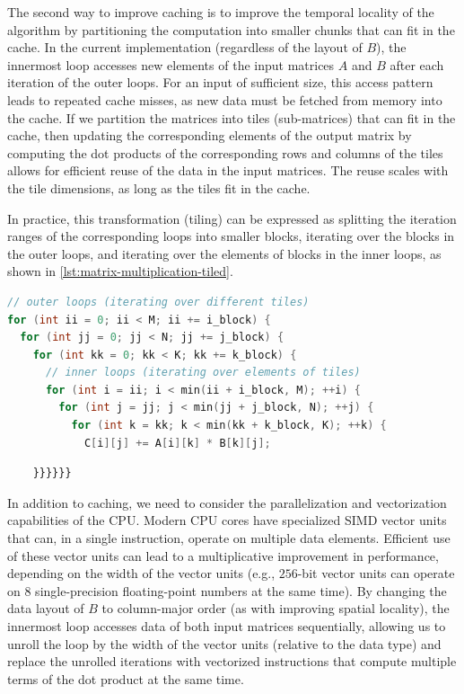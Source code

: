 The second way to improve caching is to improve the temporal locality of the algorithm by partitioning the computation into smaller chunks that can fit in the cache. In the current implementation (regardless of the layout of $B$), the innermost loop accesses new elements of the input matrices $A$ and $B$ after each iteration of the outer loops. For an input of sufficient size, this access pattern leads to repeated cache misses, as new data must be fetched from memory into the cache. If we partition the matrices into tiles (sub-matrices) that can fit in the cache, then updating the corresponding elements of the output matrix by computing the dot products of the corresponding rows and columns of the tiles allows for efficient reuse of the data in the input matrices. The reuse scales with the tile dimensions, as long as the tiles fit in the cache.

In practice, this transformation (tiling) can be expressed as splitting the iteration ranges of the corresponding loops into smaller blocks, iterating over the blocks in the outer loops, and iterating over the elements of blocks in the inner loops, as shown in \cref{lst:matrix-multiplication-tiled}.

\begin{lstlisting}[language=C++, caption={Tiled matrix multiplication}, label={lst:matrix-multiplication-tiled}]
// outer loops (iterating over different tiles)
for (int ii = 0; ii < M; ii += i_block) {
  for (int jj = 0; jj < N; jj += j_block) {
    for (int kk = 0; kk < K; kk += k_block) {
      // inner loops (iterating over elements of tiles)
      for (int i = ii; i < min(ii + i_block, M); ++i) {
        for (int j = jj; j < min(jj + j_block, N); ++j) {
          for (int k = kk; k < min(kk + k_block, K); ++k) {
            C[i][j] += A[i][k] * B[k][j];
\end{lstlisting}

\begin{lstlisting}
    }}}}}}
\end{lstlisting}
\fi

In addition to caching, we need to consider the parallelization and vectorization capabilities of the CPU\@. Modern CPU cores have specialized SIMD vector units that can, in a single instruction, operate on multiple data elements. Efficient use of these vector units can lead to a multiplicative improvement in performance, depending on the width of the vector units (e.g., $256$-bit vector units can operate on $8$ single-precision floating-point numbers at the same time). By changing the data layout of $B$ to column-major order (as with improving spatial locality), the innermost loop accesses data of both input matrices sequentially, allowing us to unroll the loop by the width of the vector units (relative to the data type) and replace the unrolled iterations with vectorized instructions that compute multiple terms of the dot product at the same time.


